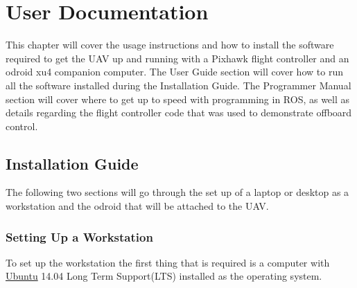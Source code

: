 
\chapter{User Documentation}

This chapter will cover the usage instructions and how to install the software required to get the UAV up and running with a Pixhawk flight controller and an odroid xu4 companion computer. The User Guide section will cover how to run all the software installed during the Installation Guide. The Programmer Manual section will cover where to get up to speed with programming in ROS, as well as details regarding the flight controller code that was used to demonstrate offboard control.

\section{Installation Guide}
The following two sections will go through the set up of a laptop or desktop as a workstation and the odroid that will be attached to the UAV.
\subsection{Setting Up a Workstation}
To set up the workstation the first thing that is required is a computer with \href{http://www.ubuntu.com/download/desktop}{Ubuntu} 14.04 Long Term Support(LTS) installed as the operating system. 
